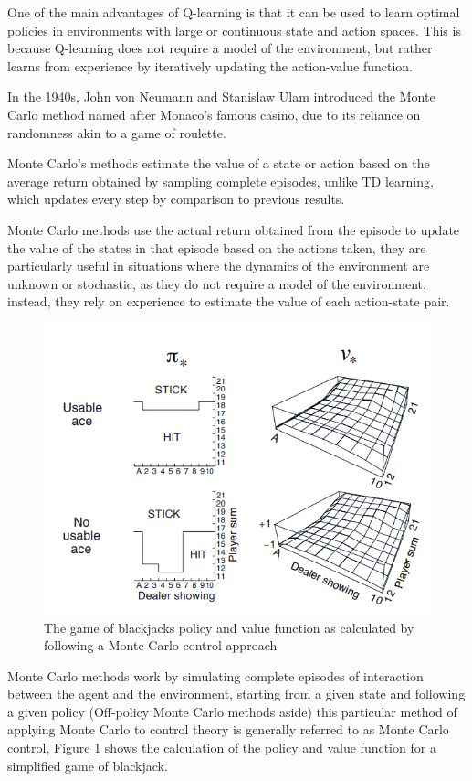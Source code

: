 One of the main advantages of Q-learning is that it can be used to learn optimal policies in environments with large or continuous state and action spaces. This is because Q-learning does not require a model of the environment, but rather learns from experience by iteratively updating the action-value function.

In the 1940s, John von Neumann and Stanislaw Ulam introduced the Monte Carlo method named after Monaco's famous casino, due to its reliance on randomness akin to a game of roulette.

Monte Carlo's methods estimate the value of a state or action based on the average return obtained by sampling complete episodes, unlike TD learning, which updates every step by comparison to previous results.

Monte Carlo methods use the actual return obtained from the episode to update the value of the states in that episode based on the actions taken, they are particularly useful in situations where the dynamics of the environment are unknown or stochastic, as they do not require a model of the environment, instead, they rely on experience to estimate the value of each action-state pair.

\begin{figure}[!h]
    \centering
    \includegraphics[width=.7\textwidth]{fig/rl/Monte Carlo Blackjack convergence.png}
    \caption{The game of blackjacks policy and value function as calculated by following a Monte Carlo control approach}
    \label{fig:monte-carlo}
\end{figure}

Monte Carlo methods work by simulating complete episodes of interaction between the agent and the environment, starting from a given state and following a given policy (Off-policy Monte Carlo methods aside) this particular method of applying Monte Carlo to control theory is generally referred to as Monte Carlo control, Figure \ref{fig:monte-carlo} shows the calculation of the policy and value function for a simplified game of blackjack.

